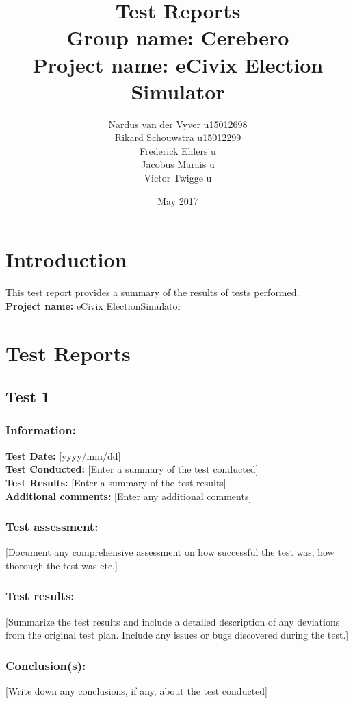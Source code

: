 \documentclass{article}
\title{\textbf{Test Reports}\\
        \textbf{Group name:} Cerebero\\
       \textbf{ Project name:} eCivix Election Simulator}
\date{May 2017}
\author{Nardus van der Vyver u15012698 \\
          Rikard Schouwstra u15012299 \\
          Frederick Ehlers u \\
          Jacobus Marais u \\
          Victor Twigge u \\}
\newcommand\tab[1][1cm]{\hspace*{#1}}
\begin{document}
  \maketitle

  \tableofcontents

  \section{Introduction}
      This test report provides a summary of the results of tests performed.\\
      \textbf{Project name:} eCivix ElectionSimulator

  \section{Test Reports}
      \subsection{Test 1}
          \subsubsection{Information:}
              \tab \textbf{Test Date:} [yyyy/mm/dd]\\
              \tab \textbf{Test Conducted:} [Enter a summary of the test conducted]\\
              \tab \textbf{Test Results:} [Enter a summary of the test results]\\
              \tab \textbf{Additional comments:} [Enter any additional comments]\\

          \subsubsection{Test assessment:}
              [Document any comprehensive assessment on how successful the test was, how thorough the test was etc.]

          \subsubsection{Test results:}
              [Summarize the test results and include a detailed description of any deviations from the original test plan. Include any issues or bugs discovered during the test.]

          \subsubsection{Conclusion(s):}
              [Write down any conclusions, if any, about the test conducted]
\end{document}
